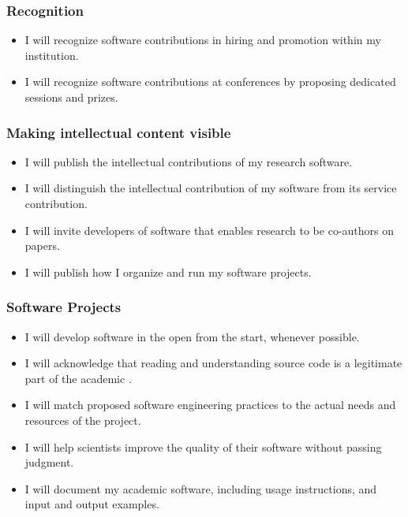 \documentclass[a4paper,UKenglish]{dagman}
\renewcommand{\paragraph}[1]{\subsubsection*{#1}\xspace}
\begin{document}
\paragraph{Recognition}
\begin{itemize}
\item I will recognize software contributions in hiring and promotion within my institution.
\item I will recognize software contributions at conferences by proposing dedicated sessions and prizes.
\end{itemize}

\paragraph{Making intellectual content visible}
\begin{itemize}
\item I will publish the intellectual contributions of my research software.
\item I will distinguish the intellectual contribution of my software from its service contribution.
\item I will invite developers of software that enables research to be co-authors on papers.
\item I will publish how I organize and run my software projects.
\end{itemize}

\paragraph{Software Projects}
\begin{itemize}
\item I will develop software in the open from the start, whenever possible.
\item I will acknowledge that reading and understanding source code is a legitimate part of the academic .
\item I will match proposed software engineering practices to the actual needs and resources of the project.
\item I will help scientists improve the quality of their software without passing judgment.
\item I will document my academic software, including usage instructions, and input and output examples.
\end{itemize}
\end{document}
